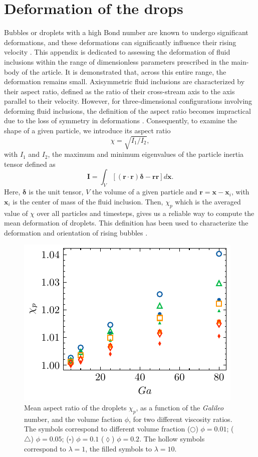 
\section{Deformation of the drops}
\label{ap:deformation} 

Bubbles or droplets with a high Bond number are known to undergo significant deformations, and these deformations can significantly influence their rising velocity \citep{bunner2003effect,tripathi2014}. 
This appendix is dedicated to assessing the deformation of fluid inclusions within the range of dimensionless parameters prescribed in the main-body of the article. 
It is demonstrated that, across this entire range, the deformation remains small. 
Axisymmetric fluid inclusions are characterized by their aspect ratio, defined as the ratio of their cross-stream axis to the axis parallel to their velocity. 
However, for three-dimensional configurations involving deforming fluid inclusions, the definition of the aspect ratio becomes impractical due to the loss of symmetry in deformations \citep{bunner2003effect}. 
Consequently, to examine the shape of a given particle, we introduce its aspect ratio  
\begin{equation}
    \chi =  \sqrt{I_1 /I_2},
\end{equation}
with $I_1$ and $I_2$, the maximum and minimum eigenvalues of the particle inertia tensor defined as
\begin{equation*}
    \textbf{I}
    = \int_{V} \left[
        (\textbf{r}\cdot \textbf{r}) \bm\delta  - \textbf{rr}
        \right]
    d\textbf{x}.
\end{equation*}
Here, $\bm\delta$ is the unit tensor, $V$ the volume of a given particle and $\textbf{r} = \textbf{x} - \textbf{x}_i$, with $\textbf{x}_i$ is the center of mass of the fluid inclusion. 
Then, $\chi_p$ which is the averaged value of $\chi$ over all particles and timesteps, gives us a reliable way to compute the mean deformation of droplets. 
This definition has been used to characterize the deformation and orientation of rising bubbles \citep{bunner2003effect}. 
\begin{figure}[h!]
    \centering
    \includegraphics[height = 0.3\textwidth]{image/HOMOGENEOUS_final/PA/chi.pdf}
    \caption{Mean aspect ratio of the droplets $\chi_p$, as a function of the \textit{Galileo} number, and the volume faction $\phi$,  for two different viscosity ratios.  
    The symbols correspond to different volume fraction ($\pmb\bigcirc$) $\phi = 0.01$; ($\pmb\triangle$) $ \phi = 0.05$; ($\pmb\square$) $\phi = 0.1$ ($\pmb\lozenge$) $\phi = 0.2$.
    The hollow symbols correspond to $\lambda = 1$, the filled symbols to $\lambda = 10$.
    }
    \label{fig:chi}
\end{figure}
